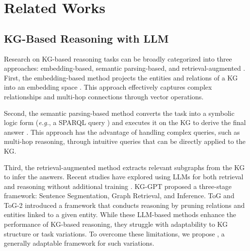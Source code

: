 \section{Related Works}
\subsection{KG-Based Reasoning with LLM}
\label{sec:related_kg_based}
Research on KG-based reasoning tasks can be broadly categorized into three approaches: embedding-based, semantic parsing-based, and retrieval-augmented \cite{lan2022complexknowledgebasequestion, ji-etal-2024-retrieval, mavromatis2024gnnraggraphneuralretrieval}. First, the embedding-based method projects the entities and relations of a KG into an embedding space \cite{saxena-etal-2020-improving}. This approach effectively captures complex relationships and multi-hop connections through vector operations.

Second, the semantic parsing-based method converts the task into a symbolic logic form (\textit{e.g.}, a SPARQL query \cite{perez2009semantics}) and executes it on the KG to derive the final answer \cite{Sun_Zhang_Cheng_Qu_2020, park2021knowledge, ye-etal-2022-rng, gu-su-2022-arcaneqa, yu2023decafjointdecodinganswers}. This approach has the advantage of handling complex queries, such as multi-hop reasoning, through intuitive queries that can be directly applied to the KG.

Third, the retrieval-augmented method extracts relevant subgraphs from the KG to infer the answers.
Recent studies have explored using LLMs for both retrieval and reasoning without additional training \cite{kim-etal-2023-kg, wang2023knowledgedrivencotexploringfaithful, structgpt, li-etal-2023-shot, ToG, ToG2.0}. KG-GPT \cite{kim-etal-2023-kg} proposed a three-stage framework: Sentence Segmentation, Graph Retrieval, and Inference. ToG \cite{ToG} and ToG-2 \cite{ToG2.0} introduced a framework that conducts reasoning by pruning relations and entities linked to a given entity. While these LLM-based methods enhance the performance of KG-based reasoning, they struggle with adaptability to KG structure or task variations.
To overcome these limitations, we propose \modelname, a generally adaptable framework for such variations.

